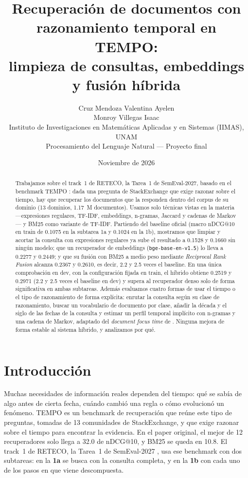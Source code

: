 \documentclass[11pt,a4paper]{article}
\title{Recuperación de documentos con razonamiento temporal en TEMPO:\\
limpieza de consultas, embeddings y fusión híbrida}
\author{Cruz Mendoza Valentina Ayelen\\
Monroy Villegas Isaac\\
{\small Instituto de Investigaciones en Matemáticas Aplicadas y en Sistemas (IIMAS), UNAM}\\
Procesamiento del Lenguaje Natural --- Proyecto final}
\date{Noviembre de 2026}
\begin{document}
\maketitle

\begin{abstract}
Trabajamos sobre el track~1 de RETECO, la Tarea~1 de SemEval-2027, basado en el benchmark TEMPO \citep{abdallah2026tempo}: dada una pregunta de StackExchange que exige razonar sobre el tiempo, hay que recuperar los documentos que la responden dentro del corpus de su dominio (13 dominios, 1.17~M documentos). Usamos solo técnicas vistas en la materia ---expresiones regulares, TF-IDF, embeddings, n-gramas, Jaccard y cadenas de Markov--- y BM25 como variante de TF-IDF. Partiendo del baseline oficial (macro nDCG@10 en train de 0.1075 en la subtarea 1a y 0.1024 en la 1b), mostramos que limpiar y acortar la consulta con expresiones regulares ya sube el resultado a 0.1528 y 0.1660 sin ningún modelo; que un recuperador de embeddings (\texttt{bge-base-en-v1.5}) lo lleva a 0.2277 y 0.2449; y que su fusión con BM25 a medio peso mediante \emph{Reciprocal Rank Fusion} alcanza 0.2367 y 0.2610, es decir, 2.2 y 2.5 veces el baseline. En una única comprobación en dev, con la configuración fijada en train, el híbrido obtiene 0.2519 y 0.2971 (2.2 y 2.5 veces el baseline en dev) y supera al recuperador denso solo de forma significativa en ambas subtareas. Además evaluamos cuatro formas de usar el tiempo o el tipo de razonamiento de forma explícita: enrutar la consulta según su clase de razonamiento, buscar un vocabulario de documento por clase, añadir la década y el siglo de las fechas de la consulta y estimar un perfil temporal implícito con n-gramas y una cadena de Markov, adaptado del \emph{document focus time} de \citet{jatowt2013focus}. Ninguna mejora de forma estable al sistema híbrido, y analizamos por qué.
\end{abstract}

\section{Introducción}

Muchas necesidades de información reales dependen del tiempo: qué se sabía de algo antes de cierta fecha, cuándo cambió una regla o cómo evolucionó un fenómeno. TEMPO \citep{abdallah2026tempo} es un benchmark de recuperación que reúne este tipo de preguntas, tomadas de 13 comunidades de StackExchange, y que exige razonar sobre el tiempo para encontrar la evidencia. En el paper original, el mejor de 12 recuperadores solo llega a 32.0 de nDCG@10, y BM25 se queda en 10.8. El track~1 de RETECO, la Tarea~1 de SemEval-2027 \citep{reteco2027}, usa ese benchmark con dos subtareas: en la \textbf{1a} se busca con la consulta completa, y en la \textbf{1b} con cada uno de los pasos en que viene descompuesta.
\end{document}
